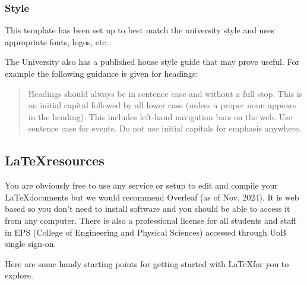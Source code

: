 \subsubsection{Style}
This template has been set up to best match the university style and uses appropriate fonts, logos, etc.

The University also has a published house style guide \parencite{uniofbirmingham2024housestyleguide} that may prove useful. For example the following guidance is given for headings:

\begin{quote}
    Headings should always be in sentence case and without a full stop. This is an initial capital followed by all lower case (unless a proper noun appears in the heading). This includes left-hand navigation bars on the web. Use sentence case for events. Do not use initial capitals for emphasis anywhere.
\end{quote}

\subsection{\LaTeX resources} \label{sec:latex_resources}
You are obviously free to use any service or setup to edit and compile your \LaTeX documents but we would recommend Overleaf (as of Nov. 2024). It is web based so you don't need to install software and you should be able to access it from any computer. There is also a professional license for all students and staff in EPS (College of Engineering and Physical Sciences) accessed through UoB single sign-on.

Here are some handy starting points for getting started with \LaTeX for you to explore.

